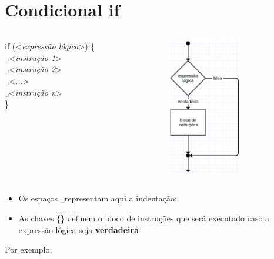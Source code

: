\documentclass[portuguese,10pt,xcolor=table]{bredelebeamer}
\def\exp[#1]{\color{gray}<\textit{#1}>\color{black}}
\def\espaco{\color{gray}\hspace{0.2cm}\color{black}}
\def\espaco{\color{blue}␣\color{black}}
\begin{document}
	\section{Condicional if}
	\begin{frame}[c]
		\begin{center}
		\end{center}
	\end{frame} 
	\begin{frame} 

				\begin{columns}[t]
					\begin{column}[T]{.4\textwidth}
						if (\exp[expressão lógica]) \{\\
						\espaco \exp[instrução 1]\\
						\espaco \exp[instrução 2]\\
						\espaco \exp[...]\\
						\espaco \exp[instrução n]\\
						\}
					\end{column}
							\begin{column}[T]{.4\textwidth}
								\includegraphics[height=6.0cm]{imagens/condicional_if.png}
							\end{column}
				\end{columns}

		\begin{itemize}
			\item Os espaços \espaco representam aqui a indentação:
			\item As chaves \{\} definem o bloco de instruções que será executado caso a expressão lógica seja \textbf{verdadeira}
		\end{itemize}
	\end{frame}
	
	\begin{frame} 
	Por exemplo:
			
	\end{frame}
\end{document}
